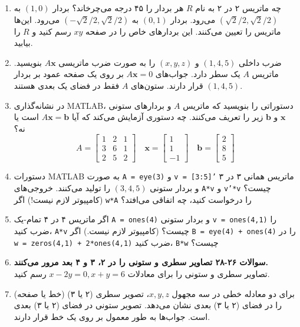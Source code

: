 \documentclass[12pt, a4paper]{book}
\begin{document}
\begin{enumerate}[label=\arabic*.]
		\item
		چه ماتریس ۲ در ۲ به نام $R$ هر بردار را ۴۵ درجه می‌چرخاند؟ بردار $(1,0)$ به $(\sqrt{2}/2, \sqrt{2}/2)$ می‌رود. بردار $(0,1)$ به $(-\sqrt{2}/2, \sqrt{2}/2)$ می‌رود. این‌ها ماتریس را تعیین می‌کنند. این بردارهای خاص را در صفحه $xy$ رسم کنید و $R$ را بیابید.
		
		\item
		ضرب داخلی $(1,4,5)$ و $(x,y,z)$ را به صورت ضرب ماتریسی $A\mathbf{x}$ بنویسید. ماتریس $A$ یک سطر دارد. جواب‌های $A\mathbf{x}=0$ بر روی یک صفحه عمود بر بردار $(1,4,5)$ قرار دارند. ستون‌های $A$ فقط در فضای یک بعدی هستند.
		
		\item
		در نشانه‌گذاری MATLAB، دستوراتی را بنویسید که ماتریس $A$ و بردارهای ستونی $\mathbf{x}$ و $\mathbf{b}$ زیر را تعریف می‌کنند. چه دستوری آزمایش می‌کند که آیا $A\mathbf{x}=\mathbf{b}$ است یا نه؟
		\[ A = \begin{bmatrix} 1 & 2 & 1 \\ 3 & 6 & 1 \\ 2 & 5 & 2 \end{bmatrix} \quad \mathbf{x} = \begin{bmatrix} 1 \\ 1 \\ -1 \end{bmatrix} \quad \mathbf{b} = \begin{bmatrix} 2 \\ 8 \\ 5 \end{bmatrix} \]
		
		\item
		دستورات MATLAB به صورت \texttt{A = eye(3)} و \texttt{v = [3:5]'} ماتریس همانی ۳ در ۳ و بردار ستونی $(3,4,5)$ را تولید می‌کنند. خروجی‌های \texttt{A*v} و \texttt{v'*v} چیست؟ (کامپیوتر لازم نیست!) اگر \texttt{w*A} را درخواست کنید، چه اتفاقی می‌افتد؟
		
		\item
		اگر ماتریس ۴ در ۴ تمام-یک \texttt{A = ones(4)} و بردار ستونی \texttt{v = ones(4,1)} را ضرب کنید، \texttt{A*v} چیست؟ (کامپیوتر لازم نیست.) اگر \texttt{B = eye(4) + ones(4)} را در \texttt{w = zeros(4,1) + 2*ones(4,1)} ضرب کنید، \texttt{B*w} چیست؟
		
		\item
		\textbf{سوالات ۲۶-۲۸ تصاویر سطری و ستونی را در ۲، ۳ و ۴ بعد مرور می‌کنند.} \\
		تصاویر سطری و ستونی را برای معادلات $x-2y=0, x+y=6$ رسم کنید.
		
		\item
		برای دو معادله خطی در سه مجهول $x,y,z$، تصویر سطری (۲ یا ۳) (خط یا صفحه) را در فضای (۲ یا ۳) بعدی نشان می‌دهد. تصویر ستونی در فضای (۲ یا ۳) بعدی است. جواب‌ها به طور معمول بر روی یک خط قرار دارند.
		

\end{enumerate}
\end{document}
